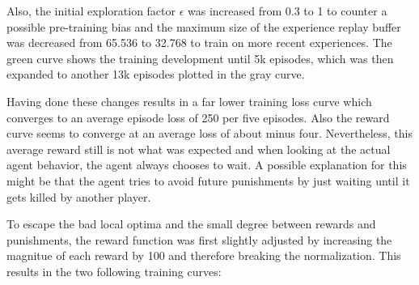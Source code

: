 Also, the initial exploration factor $\epsilon$ was increased from 0.3 to 1 to counter a possible pre-training bias and the maximum size of the experience replay buffer was decreased from 65.536 to 32.768 to train on more recent experiences. The green curve shows the training development until 5k episodes, which was then expanded to another 13k episodes plotted in the gray curve. 

Having done these changes results in a far lower training loss curve which converges to an average episode loss of 250 per five episodes. Also the reward curve seems to converge at an average loss of about minus four. Nevertheless, this average reward still is not what was expected and when looking at the actual agent behavior, the agent always chooses to wait. A possible explanation for this might be that the agent tries to avoid future punishments by just waiting until it gets killed by another player. 

To escape the bad local optima and the small degree between rewards and punishments, the reward function was first slightly adjusted by increasing the magnitue of each reward by 100 and therefore breaking the normalization. This results in the two following training curves:

